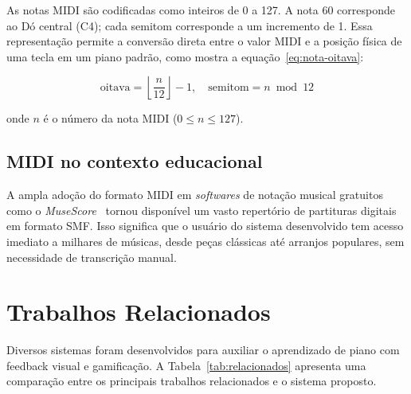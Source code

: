 \documentclass[
  12pt,
  openright,
  twoside,
  a4paper,
  english,
  brazil
]{abntex2}
\begin{document}
As notas MIDI são codificadas como inteiros de 0 a 127. A nota 60
corresponde ao Dó central (C4); cada semitom corresponde a um incremento
de 1. Essa representação permite a conversão direta entre o valor MIDI
e a posição física de uma tecla em um piano padrão, como mostra a
equação~\eqref{eq:nota-oitava}:

\begin{equation}
  \text{oitava} = \left\lfloor \frac{n}{12} \right\rfloor - 1, \quad
  \text{semitom} = n \bmod 12
  \label{eq:nota-oitava}
\end{equation}

onde $n$ é o número da nota MIDI ($0 \leq n \leq 127$).

\subsection{MIDI no contexto educacional}

A ampla adoção do formato MIDI em \textit{softwares} de notação musical
gratuitos como o \textit{MuseScore}~\cite{musescore} tornou disponível
um vasto repertório de partituras digitais em formato SMF. Isso significa
que o usuário do sistema desenvolvido tem acesso imediato a milhares de
músicas, desde peças clássicas até arranjos populares, sem necessidade
de transcrição manual.

\section{Trabalhos Relacionados}

Diversos sistemas foram desenvolvidos para auxiliar o aprendizado de
piano com feedback visual e gamificação. A
Tabela~\ref{tab:relacionados} apresenta uma comparação entre os
principais trabalhos relacionados e o sistema proposto.
\end{document}
